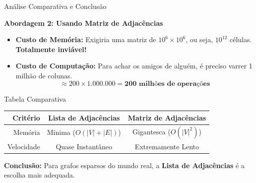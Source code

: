 \begin{frame}{Análise Comparativa e Conclusão}
    
    \textbf{Abordagem 2: Usando Matriz de Adjacências}
    
    \begin{itemize}
        \item<+-> \textbf{Custo de Memória:} Exigiria uma matriz de $10^6 \times 10^6$, ou seja, $10^{12}$ células. \textbf{Totalmente inviável!}
        \item<+-> \textbf{Custo de Computação:} Para achar os amigos de alguém, é preciso varrer 1 milhão de colunas.
            $$ \approx 200 \times 1.000.000 = \textbf{200 milhões de operações} $$
    \end{itemize}

    \pause %
    
    \begin{block}{Tabela Comparativa}
    \centering
    \begin{tabular}{r c c}
        \hline
        \textbf{Critério} & \textbf{Lista de Adjacências} & \textbf{Matriz de Adjacências} \\
        \hline
        Memória & Mínima ($O(|V|+|E|)$) & Gigantesca ($O(|V|^2)$) \\
        Velocidade & Quase Instantâneo & Extremamente Lento \\
        \hline
    \end{tabular}
    \end{block}
    
    \pause %

    \textbf{Conclusão:} Para grafos esparsos do mundo real, a \textbf{Lista de Adjacências} é a escolha mais adequada.

\end{frame}

